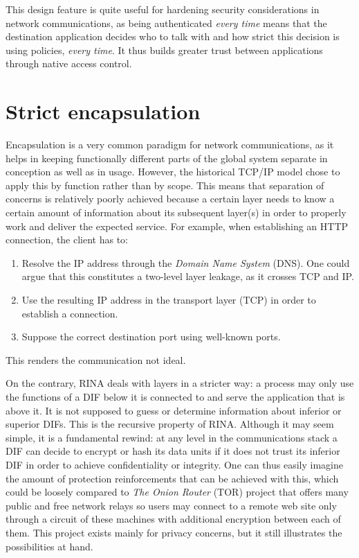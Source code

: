 \documentclass[a4paper]{proc}
\begin{document}
\par This design feature is quite useful for hardening security considerations
in network communications, as being authenticated \textit{every time} means that
the destination application decides who to talk with and how strict this
decision is using policies, \textit{every time}. It thus builds greater trust
between applications through native access control.

\section{Strict encapsulation}

\par Encapsulation is a very common paradigm for network communications, as it
helps in keeping functionally different parts of the global system separate in
conception as well as in usage. However, the historical TCP/IP model chose to
apply this by function rather than by scope. This means that separation of
concerns is relatively poorly achieved because a certain layer needs to know a
certain amount of information about its subsequent layer(s) in order to properly
work and deliver the expected service. For example, when establishing an HTTP
connection, the client has to:
\begin{enumerate}
    \item Resolve the IP address through the \textit{Domain Name System} (DNS).
        One could argue that this constitutes a two-level layer leakage, as it
        crosses TCP and IP.
    \item Use the resulting IP address in the transport layer (TCP) in order to
        establish a connection.
    \item Suppose the correct destination port using well-known ports.
\end{enumerate}
This renders the communication not ideal.

\par On the contrary, RINA deals with layers in a stricter way: a process may
only use the functions of a DIF below it is connected to and serve the
application that is above it. It is not supposed to guess or determine
information about inferior or superior DIFs. This is the recursive property of
RINA. Although it may seem simple, it is a fundamental rewind: at any level in
the communications stack a DIF can decide to encrypt or hash its data units if
it does not trust its inferior DIF in order to achieve confidentiality or
integrity. One can thus easily imagine the amount of protection reinforcements
that can be achieved with this, which could be loosely compared to \textit{The
Onion Router} (TOR) project that offers many public and free network relays so
users may connect to a remote web site only through a circuit of these machines
with additional encryption between each of them. This project exists mainly for
privacy concerns, but it still illustrates the possibilities at hand.
\end{document}
